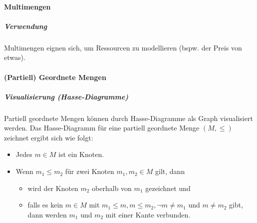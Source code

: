 		\paragraph{Multimengen}

			\subparagraph{Verwendung}
				Multimengen eignen sich, um Ressourcen zu modellieren (bspw. der Preis von etwas).

		\paragraph{(Partiell) Geordnete Mengen}

			\subparagraph{Visualisierung (Hasse-Diagramme)}
				Partiell geordnete Mengen können durch Hasse-Diagramme als Graph visualisiert werden. Das Hasse-Diagramm für eine partiell geordnete Menge $ (M, \leq) $ zeichnet ergibt sich wie folgt:
				\begin{itemize}
					\item Jedes $ m \in M $ ist ein Knoten.
					\item Wenn $ m _ 1 \leq m _ 2 $ für zwei Knoten $ m _ 1, m _ 2 \in M $ gilt, dann
						\begin{itemize}
							\item wird der Knoten $ m _ 2 $ oberhalb von $ m _ 1 $ gezeichnet und
							\item falls es kein $ m \in M $ mit $ m _ 1 \leq m, m \leq m _ 2, \lnot m \neq m _ 1 $ und $ m \neq m _ 2 $ gibt, dann werden $ m _ 1 $ und $ m _ 2 $ mit einer Kante verbunden.
						\end{itemize}
				\end{itemize}


